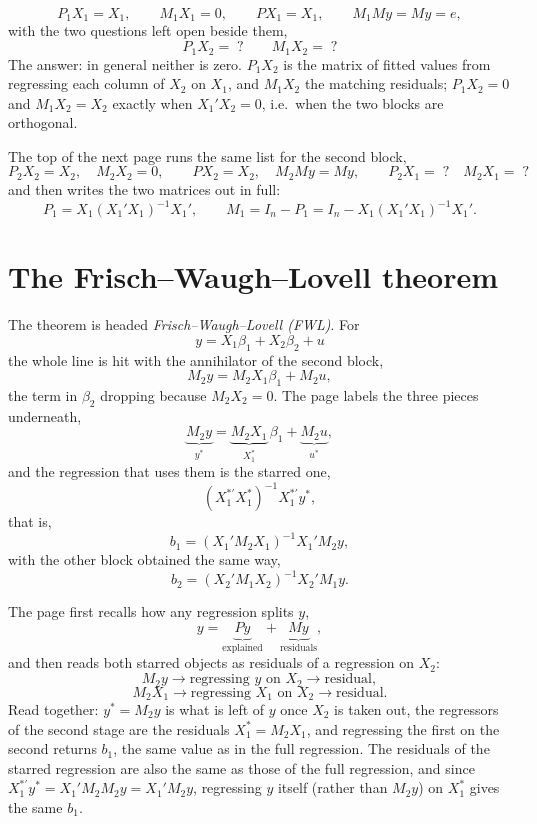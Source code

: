 \documentclass[11pt]{article}
\begin{document}
\[ P_{1}X_{1} = X_{1}, \qquad M_{1}X_{1} = 0, \qquad
   PX_{1} = X_{1}, \qquad M_{1}My = My = e, \]
with the two questions left open beside them,
\[ P_{1}X_{2} = \;? \qquad M_{1}X_{2} = \;? \]
The answer: in general neither is zero. $P_{1}X_{2}$ is the matrix of fitted values
from regressing each column of $X_{2}$ on $X_{1}$, and $M_{1}X_{2}$ the matching
residuals; $P_{1}X_{2} = 0$ and $M_{1}X_{2} = X_{2}$ exactly when $X_{1}'X_{2} = 0$,
i.e.\ when the two blocks are orthogonal.

The top of the next page runs the same list for the second block,
\[ P_{2}X_{2} = X_{2}, \quad M_{2}X_{2} = 0, \qquad
   PX_{2} = X_{2}, \quad M_{2}My = My, \qquad
   P_{2}X_{1} = \;? \quad M_{2}X_{1} = \;? \]
and then writes the two matrices out in full:
\[ P_{1} = X_{1}(X_{1}'X_{1})^{-1}X_{1}', \qquad
   M_{1} = I_{n} - P_{1} = I_{n} - X_{1}(X_{1}'X_{1})^{-1}X_{1}'. \]

\section{The Frisch--Waugh--Lovell theorem}

The theorem is headed \emph{Frisch--Waugh--Lovell (FWL)}. For
\[ y = X_{1}\beta_{1} + X_{2}\beta_{2} + u \]
the whole line is hit with the annihilator of the second block,
\[ M_{2}y = M_{2}X_{1}\beta_{1} + M_{2}u, \]
the term in $\beta_{2}$ dropping because $M_{2}X_{2} = 0$. The page labels the three
pieces underneath,
\[ \underbrace{M_{2}y}_{y^{*}} = \underbrace{M_{2}X_{1}}_{X_{1}^{*}}\,\beta_{1}
   + \underbrace{M_{2}u}_{u^{*}}, \]
and the regression that uses them is the starred one,
\[ (X_{1}^{*\prime}X_{1}^{*})^{-1}X_{1}^{*\prime}y^{*}, \]
that is,
\[ b_{1} = (X_{1}'M_{2}X_{1})^{-1}X_{1}'M_{2}y, \]
with the other block obtained the same way,
\[ b_{2} = (X_{2}'M_{1}X_{2})^{-1}X_{2}'M_{1}y. \]

The page first recalls how any regression splits $y$,
\[ y = \underbrace{Py}_{\text{explained}} + \underbrace{My}_{\text{residuals}}, \]
and then reads both starred objects as residuals of a regression on $X_{2}$:
\[ M_{2}y \longrightarrow \text{regressing } y \text{ on } X_{2}
   \longrightarrow \text{residual}, \]
\[ M_{2}X_{1} \longrightarrow \text{regressing } X_{1} \text{ on } X_{2}
   \longrightarrow \text{residual}. \]
Read together: $y^{*} = M_{2}y$ is what is left of $y$ once $X_{2}$ is taken out,
the regressors of the second stage are the residuals $X_{1}^{*} = M_{2}X_{1}$, and
regressing the first on the second returns $b_{1}$, the same value as in the full
regression. The residuals of the starred regression are also the same as those of
the full regression, and since $X_{1}^{*\prime}y^{*} = X_{1}'M_{2}M_{2}y = X_{1}'M_{2}y$,
regressing $y$ itself (rather than $M_{2}y$) on $X_{1}^{*}$ gives the same $b_{1}$.
\end{document}
